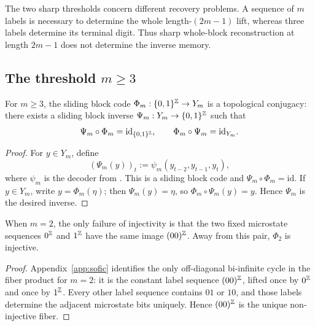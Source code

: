 \begin{remark}\label{rem:window-bound-essential}
The two sharp thresholds concern different recovery problems. A sequence of $m$ labels is necessary to determine the whole length-$(2m-1)$ lift, whereas three labels determine its terminal digit. Thus sharp whole-block reconstruction at length $2m-1$ does not determine the inverse memory.
\end{remark}

\subsection{The threshold \texorpdfstring{$m\ge3$}{m >= 3}}

\begin{theorem}\label{thm:conjugacy}
For $m\ge3$, the sliding block code $\Phi_m:\{0,1\}^{\mathbb{Z}}\to Y_m$ is a topological conjugacy: there exists a sliding block inverse $\Psi_m:Y_m\to \{0,1\}^{\mathbb{Z}}$ such that
\[
\Psi_m\circ \Phi_m=\mathrm{id}_{\{0,1\}^{\mathbb{Z}}},
\qquad
\Phi_m\circ \Psi_m=\mathrm{id}_{Y_m}.
\]
\end{theorem}

\begin{proof}
For $y\in Y_m$, define
\[
(\Psi_m(y))_t
:=\psi_m(y_{t-2},y_{t-1},y_t),
\]
where $\psi_m$ is the decoder from . This is a sliding block code and $\Psi_m\circ\Phi_m=\mathrm{id}$. If $y\in Y_m$, write $y=\Phi_m(\eta)$; then $\Psi_m(y)=\eta$, so $\Phi_m\circ\Psi_m(y)=y$. Hence $\Psi_m$ is the desired inverse.
\end{proof}

\begin{proposition}\label{thm:m2}
When $m=2$, the only failure of injectivity is that the two fixed microstate sequences $0^{\mathbb{Z}}$ and $1^{\mathbb{Z}}$ have the same image $(00)^{\mathbb{Z}}$. Away from this pair, $\Phi_2$ is injective.
\end{proposition}

\begin{proof}
Appendix~\ref{app:sofic} identifies the only off-diagonal bi-infinite cycle in the fiber product for $m=2$: it is the constant label sequence $(00)^{\mathbb{Z}}$, lifted once by $0^{\mathbb{Z}}$ and once by $1^{\mathbb{Z}}$. Every other label sequence contains $01$ or $10$, and those labels determine the adjacent microstate bits uniquely. Hence $(00)^{\mathbb{Z}}$ is the unique non-injective fiber.
\end{proof}
